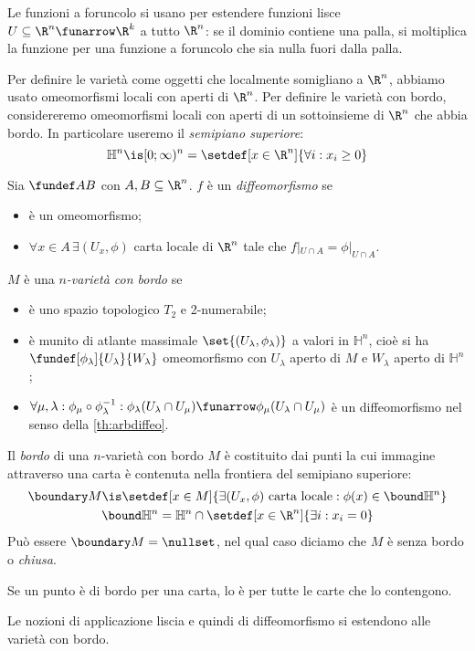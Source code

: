 Le funzioni a foruncolo si usano per estendere funzioni lisce $U\subseteq\R^n\funarrow\R^k$ a tutto $\R^n$:
se il dominio contiene una palla, si moltiplica la funzione per una funzione a foruncolo che sia nulla fuori dalla palla.
 
Per definire le varietà come oggetti che localmente somigliano a $\R^n$, abbiamo usato omeomorfismi locali con aperti di $\R^n$.
Per definire le varietà con bordo, considereremo omeomorfismi locali con aperti di un sottoinsieme di $\R^n$ che abbia bordo.
In particolare useremo il \emph{semipiano superiore}:
\[\mathbb H^n\is[0;\infty)^n=\setdef[x\in\R^n]{\forall i:x_i\ge 0}\]

\begin{defn}
	\label{th:arbdiffeo}
Sia $\fundef AB$ con $A,B\subseteq \R^n$. $f$ è un \emph{diffeomorfismo} se
\begin{itemize}
 \item è un omeomorfismo;
 \item $\forall x\in A \,\exists (U_x,\phi)$ carta locale di $\R^n$ tale che $f|_{U\cap A}=\phi|_{U\cap A}$.
\end{itemize}
\end{defn}

\begin{defn}
 $M$ è una \emph{$n$-varietà con bordo} se 
 \begin{itemize}
  \item è uno spazio topologico $T_2$ e 2-numerabile;
  \item è munito di atlante massimale $\set{(U_\lambda,\phi_\lambda)}$ a valori in $\mathbb H^n$, cioè si ha $\fundef[\phi_\lambda]{U_\lambda}{W_\lambda}$ omeomorfismo con $U_\lambda$ aperto di $M$ e $W_\lambda$ aperto di $\mathbb H^n$;
  \item $\forall \mu,\lambda: \phi_{\mu}\circ\phi_{\lambda}^{-1}:\phi_{\lambda}(U_{\lambda}\cap U_{\mu})\funarrow\phi_{\mu}(U_{\lambda}\cap U_{\mu})$ è un diffeomorfismo nel senso della \autoref{th:arbdiffeo}.
 \end{itemize}
\end{defn}
\begin{defn}[Bordo]
	Il \emph{bordo} di una $n$-varietà con bordo $M$ è costituito dai punti la cui immagine attraverso una carta è contenuta nella frontiera del semipiano superiore:
	\begin{gather*}
\boundary M \is \setdef[x\in M]{\exists(U_x,\phi)\text{ carta locale}:\phi(x) \in \bound \mathbb H^n} \\
\bound \mathbb H^n = \mathbb H^n \cap \setdef[x\in\R^n]{\exists i:x_i=0}
\end{gather*}
	Può essere $\boundary M=\nullset$, nel qual caso diciamo che $M$ è senza bordo o \emph{chiusa}.
\end{defn}
\begin{ex}
 Se un punto è di bordo per una carta, lo è per tutte le carte che lo contengono.
\end{ex}
\begin{fat}
	Le nozioni di applicazione liscia e quindi di diffeomorfismo si estendono alle varietà con bordo.
\end{fat}

